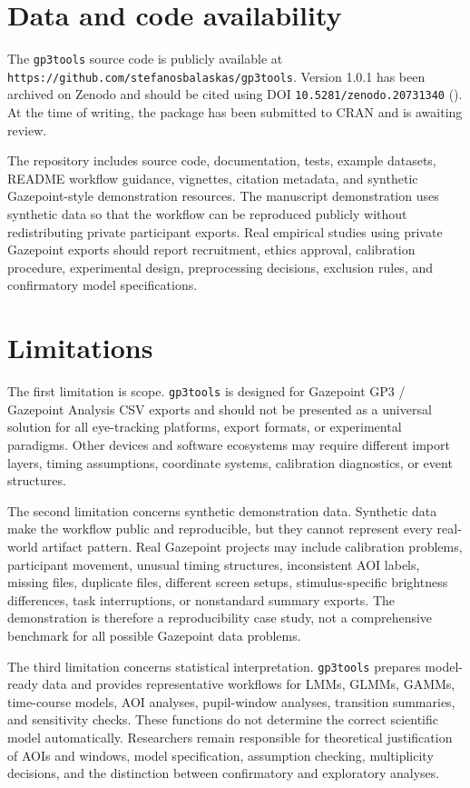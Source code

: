 \documentclass[
]{article}
\begin{document}
\section{Data and code availability}\label{data-and-code-availability}

The \texttt{gp3tools} source code is publicly available at
\texttt{https://github.com/stefanosbalaskas/gp3tools}. Version 1.0.1 has
been archived on Zenodo and should be cited using DOI
\texttt{10.5281/zenodo.20731340}
(). At the time of
writing, the package has been submitted to CRAN and is awaiting review.

The repository includes source code, documentation, tests, example
datasets, README workflow guidance, vignettes, citation metadata, and
synthetic Gazepoint-style demonstration resources. The manuscript
demonstration uses synthetic data so that the workflow can be reproduced
publicly without redistributing private participant exports. Real
empirical studies using private Gazepoint exports should report
recruitment, ethics approval, calibration procedure, experimental
design, preprocessing decisions, exclusion rules, and confirmatory model
specifications.

\section{Limitations}\label{limitations}

The first limitation is scope. \texttt{gp3tools} is designed for
Gazepoint GP3 / Gazepoint Analysis CSV exports and should not be
presented as a universal solution for all eye-tracking platforms, export
formats, or experimental paradigms. Other devices and software
ecosystems may require different import layers, timing assumptions,
coordinate systems, calibration diagnostics, or event structures.

The second limitation concerns synthetic demonstration data. Synthetic
data make the workflow public and reproducible, but they cannot
represent every real-world artifact pattern. Real Gazepoint projects may
include calibration problems, participant movement, unusual timing
structures, inconsistent AOI labels, missing files, duplicate files,
different screen setups, stimulus-specific brightness differences, task
interruptions, or nonstandard summary exports. The demonstration is
therefore a reproducibility case study, not a comprehensive benchmark
for all possible Gazepoint data problems.

The third limitation concerns statistical interpretation.
\texttt{gp3tools} prepares model-ready data and provides representative
workflows for LMMs, GLMMs, GAMMs, time-course models, AOI analyses,
pupil-window analyses, transition summaries, and sensitivity checks.
These functions do not determine the correct scientific model
automatically. Researchers remain responsible for theoretical
justification of AOIs and windows, model specification, assumption
checking, multiplicity decisions, and the distinction between
confirmatory and exploratory analyses.
\end{document}
